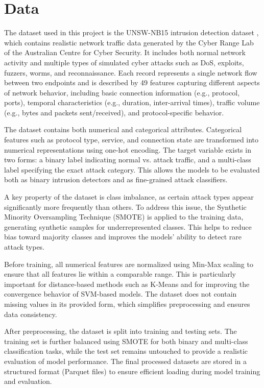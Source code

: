 \section{Data}
The dataset used in this project is the UNSW-NB15 intrusion detection dataset \cite{UNSW}, which contains realistic network traffic data generated by the Cyber Range Lab of the Australian Centre for Cyber Security. It includes both normal network activity and multiple types of simulated cyber attacks such as DoS, exploits, fuzzers, worms, and reconnaissance. Each record represents a single network flow between two endpoints and is described by 49 features capturing different aspects of network behavior, including basic connection information (e.g., protocol, ports), temporal characteristics (e.g., duration, inter-arrival times), traffic volume (e.g., bytes and packets sent/received), and protocol-specific behavior.

\nextparagraph
The dataset contains both numerical and categorical attributes. Categorical features such as protocol type, service, and connection state are transformed into numerical representations using one-hot encoding. The target variable exists in two forms: a binary label indicating normal vs. attack traffic, and a multi-class label specifying the exact attack category. This allows the models to be evaluated both as binary intrusion detectors and as fine-grained attack classifiers.

\nextparagraph
A key property of the dataset is class imbalance, as certain attack types appear significantly more frequently than others. To address this issue, the Synthetic Minority Oversampling Technique (SMOTE) is applied to the training data, generating synthetic samples for underrepresented classes. This helps to reduce bias toward majority classes and improves the models’ ability to detect rare attack types.

\nextparagraph
Before training, all numerical features are normalized using Min-Max scaling to ensure that all features lie within a comparable range. This is particularly important for distance-based methods such as K-Means and for improving the convergence behavior of SVM-based models. The dataset does not contain missing values in its provided form, which simplifies preprocessing and ensures data consistency.

\nextparagraph
After preprocessing, the dataset is split into training and testing sets. The training set is further balanced using SMOTE for both binary and multi-class classification tasks, while the test set remains untouched to provide a realistic evaluation of model performance. The final processed datasets are stored in a structured format (Parquet files) to ensure efficient loading during model training and evaluation.